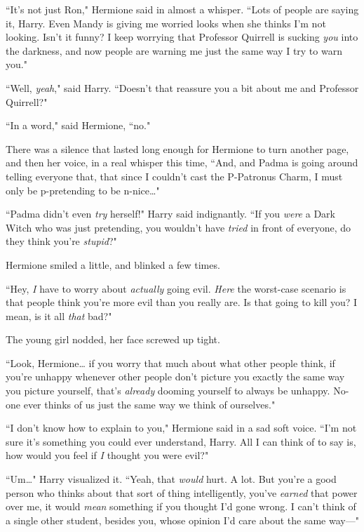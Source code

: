 ``It's not just Ron," Hermione said in almost a whisper. ``Lots of people are saying it, Harry. Even Mandy is giving me worried looks when she thinks I'm not looking. Isn't it funny? I keep worrying that Professor Quirrell is sucking \emph{you} into the darkness, and now people are warning me just the same way I try to warn you."

``Well, \emph{yeah}," said Harry. ``Doesn't that reassure you a bit about me and Professor Quirrell?"

``In a word," said Hermione, ``no."

There was a silence that lasted long enough for Hermione to turn another page, and then her voice, in a real whisper this time, ``And, and Padma is going around telling everyone that, that since I couldn't cast the P-Patronus Charm, I must only be p-pretending to be n-nice{\ldots}"

``Padma didn't even \emph{try} herself!" Harry said indignantly. ``If you \emph{were} a Dark Witch who was just pretending, you wouldn't have \emph{tried} in front of everyone, do they think you're \emph{stupid}?"

Hermione smiled a little, and blinked a few times.

``Hey, \emph{I} have to worry about \emph{actually} going evil. \emph{Here} the worst-case scenario is that people think you're more evil than you really are. Is that going to kill you? I mean, is it all \emph{that} bad?"

The young girl nodded, her face screwed up tight.

``Look, Hermione{\ldots} if you worry that much about what other people think, if you're unhappy whenever other people don't picture you exactly the same way you picture yourself, that's \emph{already} dooming yourself to always be unhappy. No-one ever thinks of us just the same way we think of ourselves."

``I don't know how to explain to you," Hermione said in a sad soft voice. ``I'm not sure it's something you could ever understand, Harry. All I can think of to say is, how would you feel if \emph{I} thought you were evil?"

``Um{\ldots}" Harry visualized it. ``Yeah, that \emph{would} hurt. A lot. But you're a good person who thinks about that sort of thing intelligently, you've \emph{earned} that power over me, it would \emph{mean} something if you thought I'd gone wrong. I can't think of a single other student, besides you, whose opinion I'd care about the same way—"

